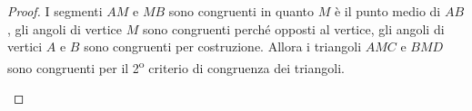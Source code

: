 \begin{exrig}
\begin{esempio}
\begin{multicols}{2}
\begin{proof}
I segmenti $AM$ e $MB$ sono congruenti in quanto $M$ è il punto medio 
di $AB$, gli angoli di vertice $M$ sono congruenti perché opposti al 
vertice, gli angoli di vertici $A$ e $B$ sono congruenti per 
costruzione. Allora i triangoli $AMC$ e $BMD$ sono congruenti per il 
2\textsuperscript{o} criterio di congruenza dei triangoli.
\begin{center}
\begin{inaccessibleblock}

\end{inaccessibleblock}
\end{center}
\end{proof}
\end{multicols}
\end{esempio}
\end{exrig}

\begin{comment}
\begin{esempio}\label{esempio:2.2}
...

\begin{multicols}{2}
Realizziamo il disegno ed esplicitiamo ipotesi e tesi.

\noindent Ipotesi: 
\tab Tesi: 

\begin{proof}
...
\begin{center}
\begin{inaccessibleblock}[Figura: TODO]

\end{inaccessibleblock}
\end{center}
\end{proof}
\end{multicols}
\end{esempio}

\begin{teorema}
...
\end{teorema}

\begin{multicols}{2}
Realizziamo il disegno ed esplicitiamo ipotesi e tesi.

\noindent Ipotesi: 
\tab Tesi: 

\begin{proof}
...
\begin{center}
\begin{inaccessibleblock}[Figura: TODO]

\end{inaccessibleblock}
\end{center}
\end{proof}
\end{multicols}
\end{comment}

